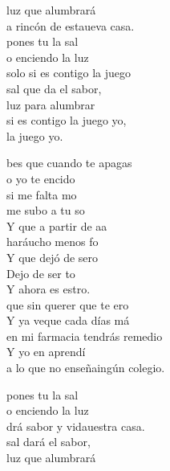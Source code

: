 \begin{cancion}
\begin{chorus}
		luz que alumbrará\\
		a rincón de estaueva casa.\\
		 pones tu la sal \\
		o enciendo la luz\\
		 solo si es contigo  la juego\\
		 sal que da el sabor, \\
		luz para alumbrar\\
		 si es contigo  la juego yo,\\
		 la juego yo.\jump\\
	\end{chorus}%
	bes que cuando te apagas \\
	o yo te encido\\
	 si me falta mo \\
	me subo a tu so\\
	Y  que a partir de aa \\
	haráucho menos fo \\
	Y  que dejó de sero \\
	Dejo de ser to\\
	Y ahora es estro.\\
	\jump
	 que sin querer que te ero\\
	Y ya veque cada días má\\
	 en mi farmacia tendrás remedio\\
	Y yo en  aprendí \\
	a lo que no enseñaingún colegio.\jump\\
	\begin{chorus}%
		 pones tu la sal \\
		o enciendo la luz\\
		drá sabor y vidauestra casa.\\
		 sal dará el sabor, \\
		luz que alumbrará\\

\end{chorus}
\end{cancion}
